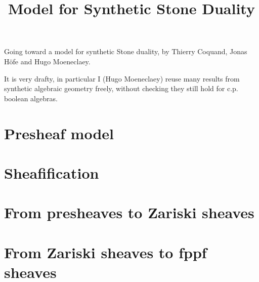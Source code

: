 \documentclass{../util/zariski}
\title{Model for Synthetic Stone Duality}
\begin{document}
\maketitle

Going toward a model for synthetic Stone duality, by Thierry Coquand, Jonas Höfe and Hugo Moeneclaey.

It is very drafty, in particular I (Hugo Moeneclaey) reuse many results from synthetic algebraic geometry freely, without checking they still hold for c.p. boolean algebras.

\tableofcontents

\section{Presheaf model}


\section{Sheafification}


\section{From presheaves to Zariski sheaves}


\section{From Zariski sheaves to fppf sheaves}




\printindex

\printbibliography
\end{document}
